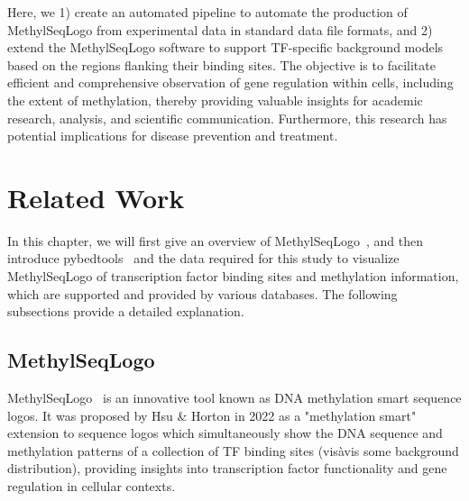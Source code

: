 \documentclass{PHlab-thesis}
\begin{document}
Here, we 1) create an automated pipeline to automate the production of MethylSeqLogo from experimental data in standard data file formats, and 2) extend the MethylSeqLogo software to support TF-specific background models based on the regions flanking their binding sites. The objective is to facilitate efficient and comprehensive observation of gene regulation within cells, including the extent of methylation, thereby providing valuable insights for academic research, analysis, and scientific communication. Furthermore, this research has potential implications for disease prevention and treatment.
\chapter{Related Work}
In this chapter, we will first give an overview of MethylSeqLogo~\cite{Hsu2022.11.05.515271}, and then introduce pybedtools~\cite{10.1093/bioinformatics/btr539} and the data required for this study to visualize MethylSeqLogo of transcription factor binding sites and methylation information, which are supported and provided by various databases. The following subsections provide a detailed explanation.
\section{MethylSeqLogo}
MethylSeqLogo~\cite{Hsu2022.11.05.515271} is an innovative tool known as DNA methylation smart sequence logos. It was proposed by Hsu \& Horton in 2022 as a "methylation smart" extension to sequence logos which simultaneously show the DNA sequence and methylation patterns of a collection of TF binding sites (visàvis some background distribution), providing insights into transcription factor functionality and gene regulation in cellular contexts.
\end{document}
